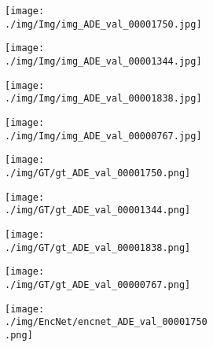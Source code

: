 \documentclass[10pt,twocolumn,letterpaper]{article}
\begin{document}
\begin{figure}
\center
    \begin{subfigure}[t]{0.11\textwidth}
            \begin{subfigure}[t]{\textwidth}
                \texttt{[image: ./img/Img/img\_ADE\_val\_00001750.jpg]}
            \end{subfigure}\vspace{.1ex}

            \begin{subfigure}[t]{\textwidth}
                \texttt{[image: ./img/Img/img\_ADE\_val\_00001344.jpg]}
            \end{subfigure}\vspace{.1ex}

         \begin{subfigure}[t]{\textwidth}
                \texttt{[image: ./img/Img/img\_ADE\_val\_00001838.jpg]}
            \end{subfigure}\vspace{.1ex}

            \begin{subfigure}[t]{\textwidth}
                \texttt{[image: ./img/Img/img\_ADE\_val\_00000767.jpg]}
            \end{subfigure}
     \end{subfigure}
\begin{subfigure}[t]{0.11\textwidth}
        \begin{subfigure}[t]{\textwidth}
                \texttt{[image: ./img/GT/gt\_ADE\_val\_00001750.png]}
            \end{subfigure}\vspace{.1ex}

        \begin{subfigure}[t]{\textwidth}
                \texttt{[image: ./img/GT/gt\_ADE\_val\_00001344.png]}
            \end{subfigure}\vspace{.1ex}

        \begin{subfigure}[t]{\textwidth}
                \texttt{[image: ./img/GT/gt\_ADE\_val\_00001838.png]}
            \end{subfigure}\vspace{.1ex}

            \begin{subfigure}[t]{\textwidth}
                \texttt{[image: ./img/GT/gt\_ADE\_val\_00000767.png]}
     \captionsetup{justification=centering}       
            \end{subfigure}
    \end{subfigure}
\begin{subfigure}[t]{0.11\textwidth}
        \begin{subfigure}[t]{\textwidth}
                \texttt{[image: ./img/EncNet/encnet\_ADE\_val\_00001750.png]}
            \end{subfigure}\vspace{.1ex}


\end{subfigure}
\end{figure}
\end{document}
